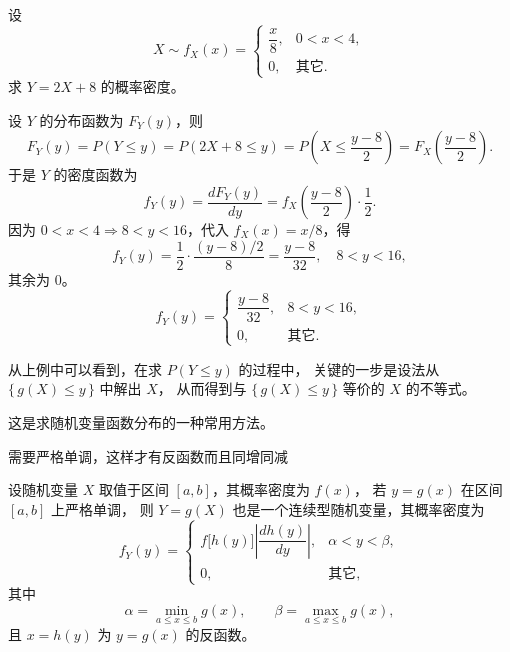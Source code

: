 \begin{example}
设
\[
X \sim f_X(x) =
\begin{cases}
\dfrac{x}{8}, & 0 < x < 4,\\[4pt]
0, & \text{其它}.
\end{cases}
\]
求 \( Y = 2X + 8 \) 的概率密度。

\begin{solution}
设 \(Y\) 的分布函数为 \(F_Y(y)\)，则
\[
F_Y(y)
= P(Y \le y)
= P(2X + 8 \le y)
= P\!\left(X \le \frac{y - 8}{2}\right)
= F_X\!\left(\frac{y - 8}{2}\right).
\]
于是 \(Y\) 的密度函数为
\[
f_Y(y)
= \frac{dF_Y(y)}{dy}
= f_X\!\left(\frac{y - 8}{2}\right) \cdot \frac{1}{2}.
\]
因为 \(0 < x < 4 \Rightarrow 8 < y < 16\)，代入 \(f_X(x)=x/8\)，得
\[
f_Y(y)
= \frac{1}{2} \cdot \frac{(y - 8)/2}{8}
= \frac{y - 8}{32}, \quad 8 < y < 16,
\]
其余为 0。
\[
\boxed{
f_Y(y) =
\begin{cases}
\dfrac{y - 8}{32}, & 8 < y < 16,\\[4pt]
0, & \text{其它.}
\end{cases}
}
\]
\end{solution}
\end{example}
\begin{remark}[函数分布求法的关键步骤]
从上例中可以看到，在求 \( P(Y \le y) \) 的过程中，  
关键的一步是设法从 \(\{\,g(X) \le y\,\}\) 中解出 \(X\)，  
从而得到与 \(\{\,g(X) \le y\,\}\) 等价的 \(X\) 的不等式。

这是求随机变量函数分布的一种常用方法。
\end{remark}
需要严格单调，这样才有反函数而且同增同减
\begin{theorem}[变量变换法求概率密度]
设随机变量 \(X\) 取值于区间 \([a,b]\)，其概率密度为 \(f(x)\)，
若 \(y = g(x)\) 在区间 \([a,b]\) 上严格单调，
则 \(Y = g(X)\) 也是一个连续型随机变量，其概率密度为
\[
f_Y(y) =
\begin{cases}
f\big[h(y)\big] \left|\dfrac{dh(y)}{dy}\right|, & \alpha < y < \beta,\\[6pt]
0, & \text{其它},
\end{cases}
\]
其中
\[
\alpha = \min_{a \le x \le b} g(x), \qquad
\beta = \max_{a \le x \le b} g(x),
\]
且 \(x = h(y)\) 为 \(y = g(x)\) 的反函数。
\end{theorem}



